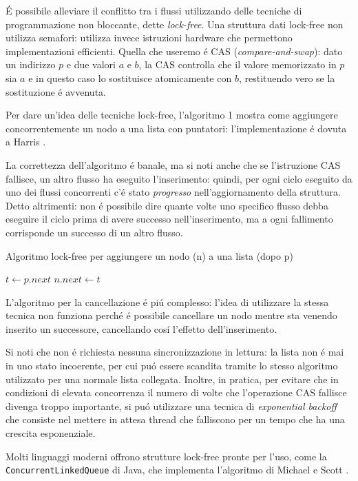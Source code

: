 É possibile alleviare il conflitto tra i flussi utilizzando delle tecniche di programmazione non bloccante, dette \textit{lock-free}. Una struttura dati lock-free non utilizza semafori: utilizza invece istruzioni hardware che permettono implementazioni efficienti. Quella che useremo é CAS (\textit{compare-and-swap}): dato un indirizzo $p$ e due valori $a$ e $b$, la CAS controlla che il valore memorizzato in $p$ sia $a$ e in questo caso lo sostituisce atomicamente con $b$, restituendo vero se la sostituzione é avvenuta.

Per dare un'idea delle tecniche lock-free, l'algoritmo 1 mostra come aggiungere concorrentemente un nodo a una lista con puntatori: l'implementazione é dovuta a Harris \cite{harris}.

La correttezza dell'algoritmo é banale, ma si noti anche che se l'istruzione CAS fallisce, un altro flusso ha eseguito l'inserimento: quindi, per ogni ciclo eseguito da uno dei flussi concorrenti c'é stato \textit{progresso} nell'aggiornamento della struttura. Detto altrimenti: non é possibile dire quante volte uno specifico flusso debba eseguire il ciclo prima di avere successo nell'inserimento, ma a ogni fallimento corrisponde un successo di un altro flusso.
\begin{algorithm}
\caption{Algoritmo lock-free per aggiungere un nodo (n) a una lista (dopo p)}
\begin{algorithmic}
\Do
\State $t \gets p.next$
\State $n.next \gets t$
\end{algorithmic}
\end{algorithm}
L'algoritmo per la cancellazione é piú complesso: l'idea di utilizzare la stessa tecnica non funziona perché é possibile cancellare un nodo mentre sta venendo inserito un successore, cancellando cosí l'effetto dell'inserimento.

Si noti che non é richiesta nessuna sincronizzazione in lettura: la lista non é mai in uno stato incoerente, per cui puó essere scandita tramite lo stesso algoritmo utilizzato per una normale lista collegata. Inoltre, in pratica, per evitare che in condizioni di elevata concorrenza il numero di volte che l'operazione CAS fallisce divenga troppo importante, si puó utilizzare una tecnica di \textit{exponential backoff} che consiste nel mettere in attesa thread che falliscono per un tempo che ha una crescita esponenziale.

Molti linguaggi moderni offrono strutture lock-free pronte per l'uso, come la \texttt{ConcurrentLinkedQueue} di Java, che implementa l'algoritmo di Michael e Scott \cite{prisonmike}.
